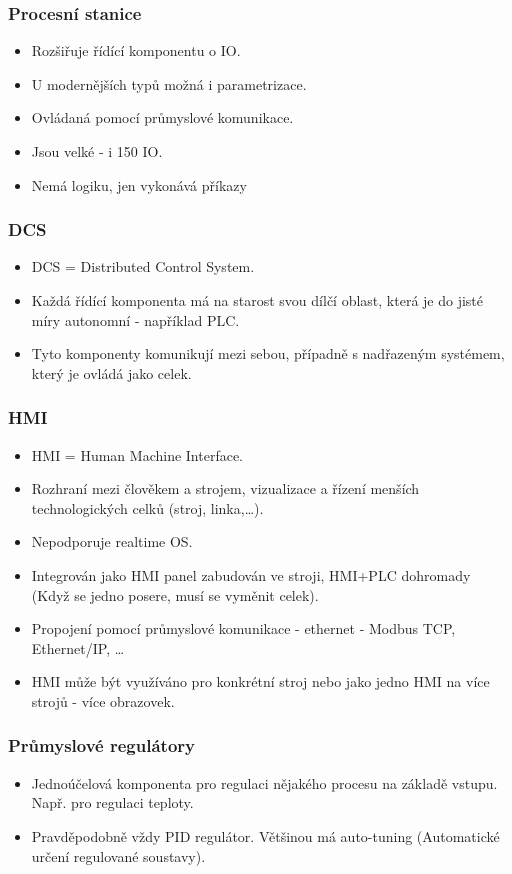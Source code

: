\subsubsection*{Procesní stanice}
\begin{itemize}
    \item Rozšiřuje řídící komponentu o IO.
    \item U modernějších typů možná i parametrizace.
    \item Ovládaná pomocí průmyslové komunikace.
    \item Jsou velké - i 150 IO.
    \item Nemá logiku, jen vykonává příkazy
\end{itemize}

\subsubsection*{DCS}
\begin{itemize}
    \item DCS = Distributed Control System.
    \item Každá řídící komponenta má na starost svou dílčí oblast, která je do jisté míry autonomní - například PLC.
    \item Tyto komponenty komunikují mezi sebou, případně s nadřazeným systémem, který je ovládá jako celek.
\end{itemize}

\subsubsection*{HMI}
\begin{itemize}
    \item HMI = Human Machine Interface.
    \item Rozhraní mezi člověkem a strojem, vizualizace a řízení menších technologických celků (stroj, linka,\dots).
    \item Nepodporuje realtime OS.
    \item Integrován jako HMI panel zabudován ve stroji, HMI+PLC dohromady (Když se jedno posere, musí se vyměnit celek).
    \item Propojení pomocí průmyslové komunikace - ethernet - Modbus TCP, Ethernet/IP, \dots
    \item HMI může být využíváno pro konkrétní stroj nebo jako jedno HMI na více strojů - více obrazovek.
\end{itemize}

\subsubsection*{Průmyslové regulátory}
\begin{itemize}
    \item Jednoúčelová komponenta pro regulaci nějakého procesu na základě vstupu. Např. pro regulaci teploty.
    \item Pravděpodobně vždy PID regulátor. Většinou má auto-tuning (Automatické určení regulované soustavy).
\end{itemize}

